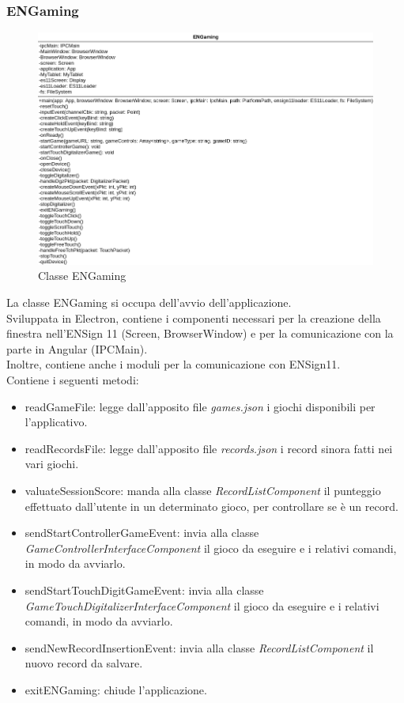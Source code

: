 \subsubsection{ENGaming}
\begin{figure}[h]
    \centering
    \includegraphics[width=340pt]{ProgettazioneTecnica/ENGamingDettaglio.png}
    \caption{Classe ENGaming}
    \label{fig:engaming}
\end{figure}
La classe ENGaming si occupa dell'avvio dell'applicazione.\\ Sviluppata in Electron, contiene i componenti necessari per la creazione della finestra nell'ENSign 11 (Screen, BrowserWindow) e per la comunicazione con la parte in Angular (IPCMain).\\
Inoltre, contiene anche i moduli per la comunicazione con ENSign11.\\
Contiene i seguenti metodi:
\begin{itemize}
    \item readGameFile: legge dall'apposito file \emph{games.json} i giochi disponibili per l'applicativo. %
    \item readRecordsFile: legge dall'apposito file \emph{records.json} i record sinora fatti nei vari giochi. %
    \item valuateSessionScore: manda alla classe \emph{RecordListComponent} il punteggio effettuato dall'utente in un determinato gioco, per controllare se è un record.
    \item sendStartControllerGameEvent: invia alla classe \emph{GameControllerInterfaceComponent} il gioco da eseguire e i relativi comandi, in modo da avviarlo.
    \item sendStartTouchDigitGameEvent: invia alla classe \emph{GameTouchDigitalizerInterfaceComponent} il gioco da eseguire e i relativi comandi, in modo da avviarlo.
    \item sendNewRecordInsertionEvent: invia alla classe \emph{RecordListComponent} il nuovo record da salvare.
    \item exitENGaming: chiude l'applicazione.
\end{itemize}
\newpage
